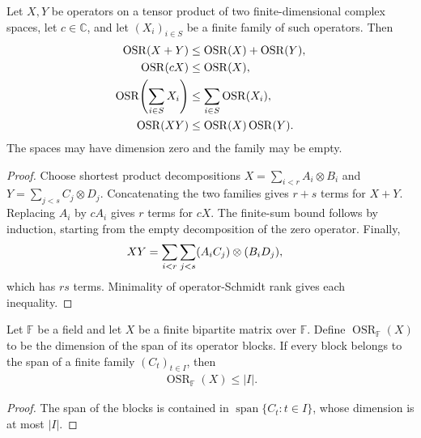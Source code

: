 \begin{theorem}
    \label{thm:operator_schmidt_rank_algebra}
    \leanok
    Let $X,Y$ be operators on a tensor product of two finite-dimensional
    complex spaces, let $c\in\mathbb C$, and let $(X_i)_{i\in S}$ be a
    finite family of such operators. Then
    \begin{align}
        \operatorname{OSR}(X+Y)
                               & \le\operatorname{OSR}(X)+\operatorname{OSR}(Y),\notag \\
        \operatorname{OSR}(cX) & \le\operatorname{OSR}(X),\notag                       \\
        \operatorname{OSR}\!\left(\sum_{i\in S}X_i\right)
                               & \le\sum_{i\in S}\operatorname{OSR}(X_i),\notag        \\
        \operatorname{OSR}(XY)
                               & \le\operatorname{OSR}(X)\operatorname{OSR}(Y).\notag
    \end{align}
    The spaces may have dimension zero and the family may be empty.
\end{theorem}

\begin{proof}\leanok
    Choose shortest product decompositions
    $X=\sum_{i<r}A_i\otimes B_i$ and
    $Y=\sum_{j<s}C_j\otimes D_j$.
    Concatenating the two families gives $r+s$ terms for $X+Y$.
    Replacing $A_i$ by $cA_i$ gives $r$ terms for $cX$.
    The finite-sum bound follows by induction, starting from the empty
    decomposition of the zero operator. Finally,
    \begin{align}
        XY & =\sum_{i<r}\sum_{j<s}(A_iC_j)\otimes(B_iD_j),\notag
    \end{align}
    which has $rs$ terms. Minimality of operator-Schmidt rank gives each
    inequality.
\end{proof}

\begin{lemma}
    \label{lem:operator_schmidt_block_span_bound}
    \leanok
    Let $\mathbb F$ be a field and let $X$ be a finite bipartite matrix over
    $\mathbb F$. Define $\operatorname{OSR}_{\mathbb F}(X)$ to be the dimension
    of the span of its operator blocks. If every block belongs to the span
    of a finite family $(C_t)_{t\in I}$, then
    \begin{align*}
        \operatorname{OSR}_{\mathbb F}(X)\le |I|.
    \end{align*}
\end{lemma}
\begin{proof}
    \leanok
    The span of the blocks is contained in $\operatorname{span}\{C_t:t\in I\}$,
    whose dimension is at most $|I|$.
\end{proof}


